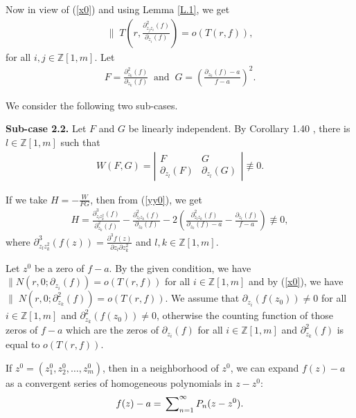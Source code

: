 \documentclass[11pt, reqno]{amsart}
\numberwithin{equation}{section}
\begin{document}
Now in view of (\ref{x0}) and using Lemma \ref{L.1}, we get
\begin{align}
\label{x00} \parallel\;T\left(r, \frac{\partial_{z_j z_i}^2(f)}{\partial_{z_i}(f)}\right)=o(T(r,f)),
\end{align}
for all $i,j\in\mathbb{Z}[1,m]$.
Let
\begin{align}
\label{yy0}F=\frac{\partial_{z_k}^2(f)}{\partial_{z_k}(f)}\;\;\text{and}\;\;G=\left(\frac{\partial_{z_k}(f)-a}{f-a}\right)^2.
\end{align}

We consider the following two sub-cases.\vspace{1.2mm}


{\bf Sub-case 2.2.} Let $F$ and $G$ be linearly independent. By Corollary 1.40 \cite{HLY}, there is $l \in \mathbb{Z}[1, m]$ such that 
\begin{align*}
W(F,G)=\left|\begin{array}{ll} F&G\\\partial_{z_l}(F)&\partial_{z_l}(G)\end{array}\right|\not\equiv 0.
\end{align*}

If we take $H=-\frac{W}{F G}$, then from (\ref{yy0}), we get
\begin{align}\label{yy1} 
H=\frac{\partial^3_{z_l z_k^2}(f)}{\partial_{z_k}^2(f)}-\frac{\partial^2_{z_lz_k}(f)}{\partial_{z_k}(f)}-2\left(\frac{\partial^2_{z_lz_k}(f)}{\partial_{z_k}(f)-a}-\frac{\partial_{z_l}(f)}{f-a}\right)\not\equiv 0,
\end{align}
where $\partial^3_{z_lz_k^2}(f(z))=\frac{\partial^3 f(z)}{\partial z_l\partial z_k^2}$ and $l,k\in\mathbb{Z}[1,m]$.

Let $z^0$ be a zero of $f-a$. By the given condition, we have $\parallel N(r,0;\partial_{z_i}(f))=o(T(r,f))$ for all $i\in\mathbb{Z}[1,m]$ and by (\ref{x0}), we have $\parallel\;N(r,0;\partial_{z_k}^2(f))=o(T(r,f))$. We assume that $\partial_{z_i}(f(z_0))\neq 0$ for all $i\in\mathbb{Z}[1,m]$ and $\partial^2_{z_k}(f(z_0))\neq 0$, otherwise the counting function of those zeros of $f-a$ which are the zeros of $\partial_{z_i}(f)$ for all $i\in\mathbb{Z}[1,m]$ and $\partial^2_{z_k}(f)$ is equal to $o(T(r,f))$.

If $z^0=(z^0_1,z^0_2,\ldots,z^0_m)$, then in a neighborhood of $z^0$, we can expand $f(z)-a$ as a convergent series of homogeneous polynomials in $z-z^0$:
\begin{align}\label{yy2} 
f(z)-a=\sideset{}{_{n=1}^{\infty}}{\sum}P_n(z-z^0).
\end{align}
\end{document}
